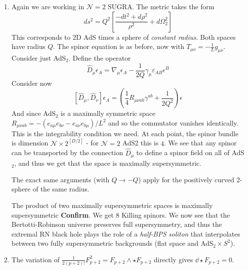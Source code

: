 \documentclass[11pt, class=article, crop=false]{standalone}
\begin{document}
\begin{enumerate}
	\item Again we are working in $\mathcal N = 2$ SUGRA. The metric takes the form
	\[
		ds^2 = Q^2 \left[ \frac{-dt^2 + d\rho^2}{\rho^2} + d \Omega_2^2 \right]
	\]
	This corresponds to 2D AdS times a sphere of \emph{constant radius}. Both spaces have radius $Q$. The spinor equation is as before, now with $T_{\mu \nu} = -\frac{1}{L} g_{\mu \nu}$. Consider just AdS$_{2}$. Define the operator 
	\[
		\hat D_{\mu} \epsilon_A = \nabla_\mu \epsilon_A - \frac{1}{2 Q} \gamma_{\mu} \varepsilon_{AB} \epsilon^B
	\]
	Consider now
	\[
		[\hat D_{\mu}, \hat D_\nu] \epsilon_A = (\frac14 R_{\mu \nu a b} \gamma^{a b} + \frac1{2Q^2}) \epsilon
	\]
	And since AdS$_{2}$ is a maximally symmetric space $R_{\mu \nu a b} = - (e_{a\mu} e_{b\nu} - e_{a \nu} e_{b \mu})/L^2$ and so the commutator vanishes identically. This is the integrability condition we need. At each point, the spinor bundle is dimension $\mathcal N \times 2^{[D/2]}$ - for $\mathcal N=2$ AdS2 this is $4$. We see that any spinor can be transported by the connection $\hat D_{\mu}$ to define a spinor field on all of AdS$_{2}$, and thus we get that the space is maximally supersymmetric.
	
	The exact same arguments (with $Q \to -Q$) apply for the positively curved 2-sphere of the same radius. 
	
	The product of two maximally supersymmetric spaces is maximally supersymmetric \textbf{Confirm}. We get $8$ Killing spinors. 
	We now see that the Bertotti-Robinson universe preserves full supersymmetry, and thus the extremal RN black hole plays the role of a \emph{half-BPS soliton} that interpolates between two fully supersymmetric backgrounds (flat space and AdS$_{2} \times S^2$). 
	
	
	
	
	\item The variation of $\frac{1}{2(p+2)!} F_{p+2}^2 = F_{p+2} \wedge \star F_{p+2}$ directly gives $\dd \star F_{p+2} = 0$. 
	

\end{enumerate}
\end{document}
